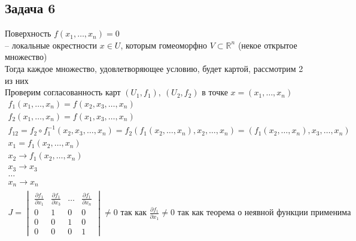 \subsection*{Задача 6}
	Поверхность $f(x_1, \ldots, x_n) = 0$\\
	 -- локальные окрестности $x \in U$, которым гомеоморфно $V \subset \mathbb{R}^{n}$ (некое открытое множество)\\
	Тогда каждое множество, удовлетворяющее условию, будет картой, рассмотрим 2 из них\\
	Проверим согласованность карт $(U_1, f_1),\ (U_2, f_2)$ в точке $x = (x_1, \ldots, x_n)$
	\begin{gather*}
		f_1(x_1, \ldots, x_n) = f(x_2, x_3, \ldots, x_n)\\
		f_2(x_1, \ldots, x_n) = f(x_1, x_3, \ldots, x_n)\\
		f_{12} = f_2 \circ f_1^{-1}(x_2, x_3, \ldots, x_n) = f_2(f_1(x_2, \ldots, x_n), x_2, \ldots, x_n) = (f_1(x_2, \ldots, x_n), x_3, \ldots, x_n)\\
		x_1 = f_1(x_2, \ldots, x_n)\\
		x_2 \to f_1(x_2, \ldots, x_n)\\
		x_3 \to x_3\\
		\ldots\\
		x_n \to x_n\\
		J = 
		\begin{vmatrix}
			\frac{\partial f_1}{\partial x_1} & \frac{\partial f_1}{\partial x_3} & \ldots & \frac{\partial f_1}{\partial x_n}\\
			0 & 1 & 0 & 0\\
			0 & 0 & 1 & 0\\
			0 & 0 & 0 & 1
		\end{vmatrix}
		\ne 0
		\text{ так как } \frac{\partial f_1}{\partial x_1} \ne 0 \text{ так как теорема о неявной функции применима}
	\end{gather*}

\newpage
